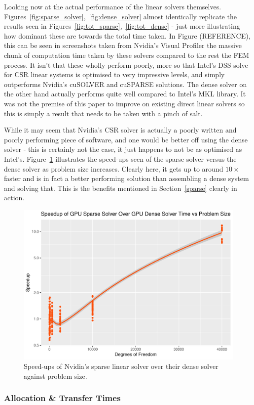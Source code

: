 Looking now at the actual performance of the linear solvers themselves. Figures~\ref{fig:sparse_solver},~\ref{fig:dense_solver} almost identically replicate the results seen in Figures~\ref{fig:tot_sparse},~\ref{fig:tot_dense} - just more illustrating how dominant these are towards the total time taken. In Figure (REFERENCE), this can be seen in screenshots taken from Nvidia's Visual Profiler the massive chunk of computation time taken by these solvers compared to the rest the FEM process. It isn't that these wholly perform poorly, more-so that Intel's DSS solve for CSR linear systems is optimised to very impressive levels, and simply outperforms Nvidia's cuSOLVER and cuSPARSE solutions. The dense solver on the other hand actually performs quite well compared to Intel's MKL library. It was not the premise of this paper to improve on existing direct linear solvers so this is simply a result that needs to be taken with a pinch of salt.

While it may seem that Nvidia's CSR solver is actually a poorly written and poorly performing piece of software, and one would be better off using the dense solver - this is certainly not the case, it just happens to not be as optimised as Intel's. Figure~\ref{fig:gpu_solve} illustrates the speed-ups seen of the sparse solver versus the dense solver as problem size increases. Clearly here, it gets up to around $10\times$ faster and is in fact a better performing solution than assembling a dense system and solving that. This is the benefits mentioned in Section~\ref{sparse} clearly in action.

\begin{figure}
	\centering
	\includegraphics[width = 0.48\linewidth]{Plots/solve_gpus_speedup_vs_n}
	\caption{Speed-ups of Nvidia's sparse linear solver over their dense solver against problem size.}
	\label{fig:gpu_solve}
\end{figure}

\subsubsection{Allocation \& Transfer Times}

